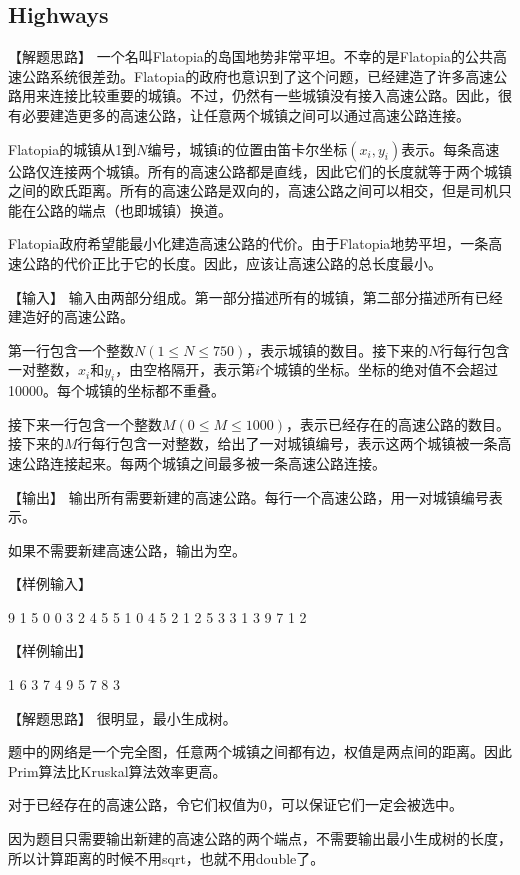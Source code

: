 \subsection{Highways}
【解题思路】
一个名叫Flatopia的岛国地势非常平坦。不幸的是Flatopia的公共高速公路系统很差劲。Flatopia的政府也意识到了这个问题，已经建造了许多高速公路用来连接比较重要的城镇。不过，仍然有一些城镇没有接入高速公路。因此，很有必要建造更多的高速公路，让任意两个城镇之间可以通过高速公路连接。

Flatopia的城镇从1到$N$编号，城镇i的位置由笛卡尔坐标$(x_i,y_i)$表示。每条高速公路仅连接两个城镇。所有的高速公路都是直线，因此它们的长度就等于两个城镇之间的欧氏距离。所有的高速公路是双向的，高速公路之间可以相交，但是司机只能在公路的端点（也即城镇）换道。

Flatopia政府希望能最小化建造高速公路的代价。由于Flatopia地势平坦，一条高速公路的代价正比于它的长度。因此，应该让高速公路的总长度最小。

【输入】
输入由两部分组成。第一部分描述所有的城镇，第二部分描述所有已经建造好的高速公路。

第一行包含一个整数$N(1 \leq N \leq 750)$，表示城镇的数目。接下来的$N$行每行包含一对整数，$x_i$和$y_i$，由空格隔开，表示第$i$个城镇的坐标。坐标的绝对值不会超过10000。每个城镇的坐标都不重叠。

接下来一行包含一个整数$M(0 \leq M \leq 1000)$，表示已经存在的高速公路的数目。接下来的$M$行每行包含一对整数，给出了一对城镇编号，表示这两个城镇被一条高速公路连接起来。每两个城镇之间最多被一条高速公路连接。

【输出】
输出所有需要新建的高速公路。每行一个高速公路，用一对城镇编号表示。

如果不需要新建高速公路，输出为空。

【样例输入】
\begin{Code}
    9
    1 5
    0 0
    3 2
    4 5
    5 1
    0 4
    5 2
    1 2
    5 3
    3
    1 3
    9 7
    1 2
\end{Code}

【样例输出】
\begin{Code}
    1 6
    3 7
    4 9
    5 7
    8 3
\end{Code}

【解题思路】
很明显，最小生成树。

题中的网络是一个完全图，任意两个城镇之间都有边，权值是两点间的距离。因此Prim算法比Kruskal算法效率更高。

对于已经存在的高速公路，令它们权值为0，可以保证它们一定会被选中。

因为题目只需要输出新建的高速公路的两个端点，不需要输出最小生成树的长度，所以计算距离的时候不用sqrt，也就不用double了。


